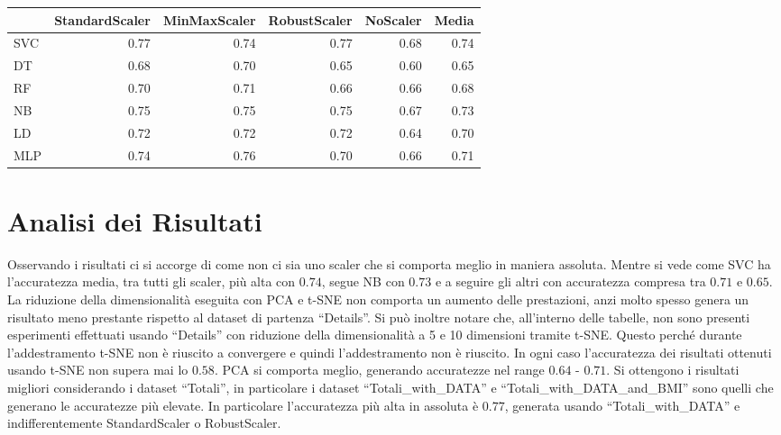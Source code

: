 \documentclass[12pt,italian]{report}
\begin{document}
\begin{table}[h]
	\begin{center}
		\begin{adjustbox}{max width=\textwidth}
			\begin{tabular}{lrrrrr}
				\toprule
				{} &  StandardScaler &  MinMaxScaler &  RobustScaler &  NoScaler &  Media \\
				\midrule
				SVC &        \cellcolor{orange}0.77 &      0.74 &      \cellcolor{orange}0.77 &  0.68 &   0.74 \\
				DT  &        0.68 &      0.70 &      0.65 &  0.60 &   0.65 \\
				RF  &        0.70 &      0.71 &      0.66 &  0.66 &   0.68 \\
				NB  &        0.75 &      0.75 &      0.75 &  0.67 &   0.73 \\
				LD  &        0.72 &      0.72 &      0.72 &  0.64 &   0.70 \\
				MLP &        0.74 &      0.76 &      0.70 &  0.66 &   0.71 \\
				\bottomrule
			\end{tabular}
		\end{adjustbox}
	\end{center}
\end{table}


\section{Analisi dei  Risultati}
Osservando i risultati ci si accorge di come non ci sia uno scaler che si comporta meglio in maniera assoluta. Mentre si vede come SVC ha l'accuratezza media, tra tutti gli scaler, più alta con $0.74$, segue NB con $0.73$ e a seguire gli altri con accuratezza compresa tra $0.71$ e $0.65$.
La riduzione della dimensionalità eseguita con PCA e t-SNE non comporta un aumento delle prestazioni, anzi molto spesso genera un risultato meno prestante rispetto al dataset di partenza ``Details''. Si può inoltre notare che, all'interno delle tabelle, non sono presenti esperimenti effettuati usando ``Details'' con riduzione della dimensionalità a 5 e 10 dimensioni tramite t-SNE. Questo perché durante l'addestramento t-SNE non è riuscito a convergere e quindi l'addestramento non è riuscito.
In ogni caso l'accuratezza dei risultati ottenuti usando t-SNE non supera mai lo $0.58$. PCA si comporta meglio, generando accuratezze nel range $0.64$ - $0.71$.
Si ottengono i risultati migliori considerando i dataset ``Totali'', in particolare i dataset ``Totali\_with\_DATA'' e ``Totali\_with\_DATA\_and\_BMI'' sono quelli che generano le accuratezze più elevate. In particolare l'accuratezza più alta in assoluta è $0.77$, generata usando ``Totali\_with\_DATA'' e indifferentemente StandardScaler o RobustScaler.
\end{document}
